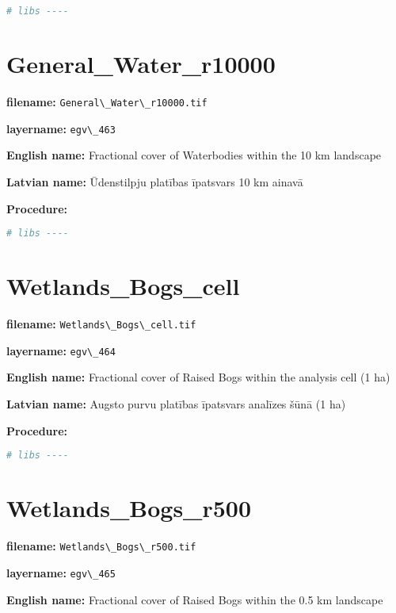 \documentclass[
]{book}
\newcommand{\passthrough}[1]{#1}
\begin{document}
\begin{lstlisting}[language=R]
# libs ----
\end{lstlisting}

\section{General\_Water\_r10000}\label{ch06.463}

\textbf{filename:} \passthrough{\lstinline!General\_Water\_r10000.tif!}

\textbf{layername:} \passthrough{\lstinline!egv\_463!}

\textbf{English name:} Fractional cover of Waterbodies within the 10 km landscape

\textbf{Latvian name:} Ūdenstilpju platības īpatsvars 10 km ainavā

\textbf{Procedure:}

\begin{lstlisting}[language=R]
# libs ----
\end{lstlisting}

\section{Wetlands\_Bogs\_cell}\label{ch06.464}

\textbf{filename:} \passthrough{\lstinline!Wetlands\_Bogs\_cell.tif!}

\textbf{layername:} \passthrough{\lstinline!egv\_464!}

\textbf{English name:} Fractional cover of Raised Bogs within the analysis cell (1 ha)

\textbf{Latvian name:} Augsto purvu platības īpatsvars analīzes šūnā (1 ha)

\textbf{Procedure:}

\begin{lstlisting}[language=R]
# libs ----
\end{lstlisting}

\section{Wetlands\_Bogs\_r500}\label{ch06.465}

\textbf{filename:} \passthrough{\lstinline!Wetlands\_Bogs\_r500.tif!}

\textbf{layername:} \passthrough{\lstinline!egv\_465!}

\textbf{English name:} Fractional cover of Raised Bogs within the 0.5 km landscape
\end{document}
